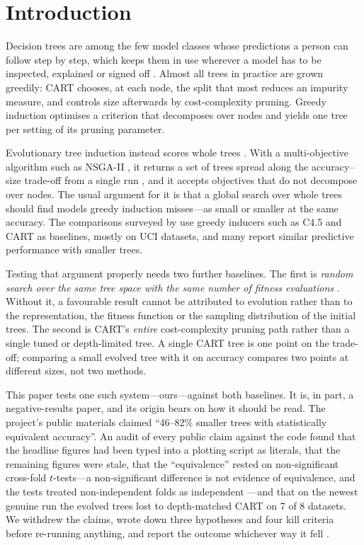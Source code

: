 \documentclass[11pt]{article}
\begin{document}
\section{Introduction}

Decision trees are among the few model classes whose predictions a person can follow
step by step, which keeps them in use wherever a model has to be inspected, explained or
signed off \citep{rudin2019}. Almost all trees in practice are grown greedily:
CART \citep{breiman1984} chooses, at each node, the split that most reduces an impurity
measure, and controls size afterwards by cost-complexity pruning. Greedy induction
optimises a criterion that decomposes over nodes and yields one tree per setting of its
pruning parameter.

Evolutionary tree induction instead scores whole trees
\citep{barros2012,kretowski2019,rivera2022}. With a multi-objective algorithm such as
NSGA-II \citep{deb2002}, it returns a set of trees spread along the accuracy--size
trade-off from a single run \citep{zhao2007}, and it accepts objectives that do not
decompose over nodes. The usual argument for it is that a global search over whole trees
should find models greedy induction misses---as small or smaller at the same accuracy.
The comparisons surveyed by \citet{barros2012} use greedy inducers such as C4.5 and CART
as baselines, mostly on UCI datasets, and many report similar predictive performance with
smaller trees.

Testing that argument properly needs two further baselines. The first is \emph{random
search over the same tree space with the same number of fitness evaluations}
\citep{bergstra2012}. Without it, a favourable result cannot be attributed to evolution
rather than to the representation, the fitness function or the sampling distribution of
the initial trees. The second is CART's \emph{entire} cost-complexity pruning path rather
than a single tuned or depth-limited tree. A single CART tree is one point on the
trade-off; comparing a small evolved tree with it on accuracy compares two points at
different sizes, not two methods.

This paper tests one such system---ours---against both baselines. It is, in part, a
negative-results paper, and its origin bears on how it should be read. The project's
public materials claimed ``46--82\% smaller trees with statistically equivalent
accuracy''. An audit of every public claim against the code found that the headline
figures had been typed into a plotting script as literals, that the remaining figures were
stale, that the ``equivalence'' rested on non-significant cross-fold $t$-tests---a
non-significant difference is not evidence of equivalence, and the tests treated
non-independent folds as independent \citep{dietterich1998}---and that on the newest
genuine run the evolved trees lost to depth-matched CART on 7 of 8 datasets. We withdrew
the claims, wrote down three hypotheses and four kill criteria before re-running anything,
and report the outcome whichever way it fell \citep{nosek2018}.
\end{document}
